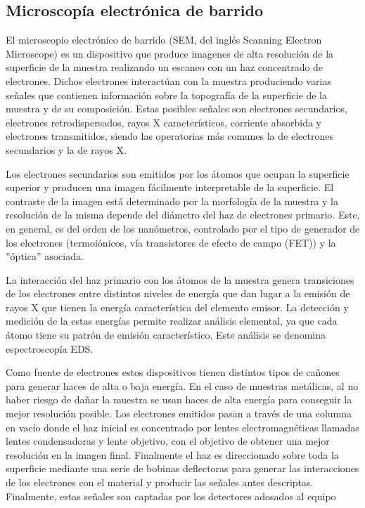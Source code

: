 \documentclass[12pt]{article}
\theoremstyle{definition}
\theoremstyle{remark}
\begin{document}
\subsection{Microscopía electrónica de barrido}
El microscopio electrónico de barrido (SEM, del inglés Scanning Electron Microscope) es un dispositivo que produce imagenes de alta resolución de la superficie de la muestra realizando un escaneo con un haz concentrado de electrones. Dichos electrones interactúan con la muestra produciendo varias señales que contienen información sobre la topografía de la superficie de la muestra y de su composición. Estas posibles señales son electrones secundarios, electrones retrodispersados, rayos X característicos, corriente absorbida y electrones transmitidos, siendo las operatorias más comunes la de electrones secundarios y la de rayos X.

Los electrones secundarios son emitidos por los átomos que ocupan la superficie superior y producen una imagen fácilmente interpretable de la superficie. El contraste de la imagen está determinado por la morfología de la muestra y la resolución de la misma depende del diámetro del haz de electrones primario. Este, en general, es del orden de los nanómetros, controlado por el tipo de generador de los electrones (termoiónicos, vía transistores de efecto de campo (FET)) y la ''óptica” asociada.

La interacción del haz primario con los átomos de la muestra genera transiciones de los electrones entre distintos niveles de energía que dan lugar a la emisión de rayos X que tienen la energía característica del elemento emisor. La detección y medición de la estas energías permite realizar análisis elemental, ya que cada átomo tiene su patrón de emisión característico. Este análisis se denomina espectroscopía EDS.

Como fuente de electrones estos dispositivos tienen distintos tipos de cañones para generar haces de alta o baja energía. En el caso de muestras metálicas, al no haber riesgo de dañar la muestra se usan haces de alta energía para conseguir la mejor resolución posible. Los electrones emitidos pasan a través de una columna en vacío donde el haz inicial es concentrado por lentes electromagnéticas llamadas lentes condensadoras y lente objetivo, con el objetivo de obtener una mejor resolución en la imagen final. Finalmente el haz es direccionado sobre toda la superficie mediante una serie de bobinas deflectoras para generar las interacciones de los electrones con el material y producir las señales antes descriptas. Finalmente, estas señales son captadas por los detectores adosados al equipo
\end{document}
